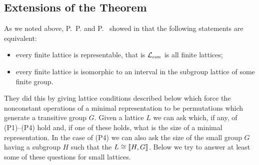 \subsection{Extensions of the \Palfy \Pudlak Theorem}
As we noted above, 
P.~P. \Palfy and P.~\Pudlak 
showed in \cite{PalfyPudlak1980}
that the
following statements are equivalent:
\begin{itemize}
\item
every finite lattice is representable, that is $\mathcal{L}_{con}$ is all
finite lattices;
\item
every finite lattice is isomorphic to an 
interval in the subgroup lattice of some finite group.
\end{itemize}
They did this by giving lattice conditions described below which force the
nonconstant operations of a minimal
representation to be permutations which generate a transitive
group $G$.
Given a lattice $L$ we can ask which, if any, of (P1)--(P4) hold and, if
one of these holds, what is the size of a minimal representation. 
In the case of (P4) we can also ask the size of the small group $G$ having a
subgroup $H$ such that the $L \cong \llbracket H,G \rrbracket$. 
Below we try to answer at least
some of these questions for small lattices. 

